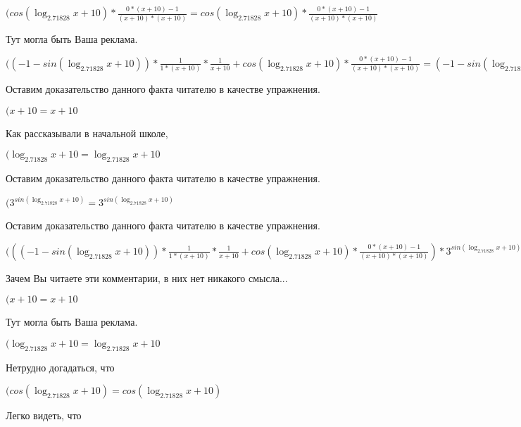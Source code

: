 \documentclass[12pt,a4paper,fleqn]{article}
\theoremstyle{definition}
\begin{document}
$(cos(\log_{ 2.71828 }{ x  +  10 }) * \frac{ 0  * ( x  +  10 ) -  1 }{( x  +  10 ) * ( x  +  10 )}
 = cos(\log_{ 2.71828 }{ x  +  10 }) * \frac{ 0  * ( x  +  10 ) -  1 }{( x  +  10 ) * ( x  +  10 )}
$

Тут могла быть Ваша реклама.

$(( -1  - sin(\log_{ 2.71828 }{ x  +  10 })) * \frac{ 1 }{ 1  * ( x  +  10 )}
 * \frac{ 1 }{ x  +  10 }
 + cos(\log_{ 2.71828 }{ x  +  10 }) * \frac{ 0  * ( x  +  10 ) -  1 }{( x  +  10 ) * ( x  +  10 )}
 = ( -1  - sin(\log_{ 2.71828 }{ x  +  10 })) * \frac{ 1 }{ 1  * ( x  +  10 )}
 * \frac{ 1 }{ x  +  10 }
 + cos(\log_{ 2.71828 }{ x  +  10 }) * \frac{ 0  * ( x  +  10 ) -  1 }{( x  +  10 ) * ( x  +  10 )}
$

Оставим доказательство данного факта читателю в качестве упражнения.

$( x  +  10  =  x  +  10 $

Как рассказывали в начальной школе,

$(\log_{ 2.71828 }{ x  +  10 } = \log_{ 2.71828 }{ x  +  10 }$

Оставим доказательство данного факта читателю в качестве упражнения.

$({ 3 }^{sin(\log_{ 2.71828 }{ x  +  10 })} = { 3 }^{sin(\log_{ 2.71828 }{ x  +  10 })}$

Оставим доказательство данного факта читателю в качестве упражнения.

$((( -1  - sin(\log_{ 2.71828 }{ x  +  10 })) * \frac{ 1 }{ 1  * ( x  +  10 )}
 * \frac{ 1 }{ x  +  10 }
 + cos(\log_{ 2.71828 }{ x  +  10 }) * \frac{ 0  * ( x  +  10 ) -  1 }{( x  +  10 ) * ( x  +  10 )}
) * { 3 }^{sin(\log_{ 2.71828 }{ x  +  10 })} = (( -1  - sin(\log_{ 2.71828 }{ x  +  10 })) * \frac{ 1 }{ 1  * ( x  +  10 )}
 * \frac{ 1 }{ x  +  10 }
 + cos(\log_{ 2.71828 }{ x  +  10 }) * \frac{ 0  * ( x  +  10 ) -  1 }{( x  +  10 ) * ( x  +  10 )}
) * { 3 }^{sin(\log_{ 2.71828 }{ x  +  10 })}$

Зачем Вы читаете эти комментарии, в них нет никакого смысла...

$( x  +  10  =  x  +  10 $

Тут могла быть Ваша реклама.

$(\log_{ 2.71828 }{ x  +  10 } = \log_{ 2.71828 }{ x  +  10 }$

Нетрудно догадаться, что

$(cos(\log_{ 2.71828 }{ x  +  10 }) = cos(\log_{ 2.71828 }{ x  +  10 })$

Легко видеть, что
\end{document}
